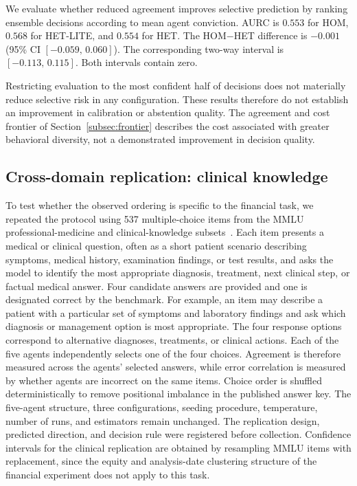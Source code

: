 \documentclass{ieeeaccess}
\begin{document}
We evaluate whether reduced agreement improves selective prediction by ranking
ensemble decisions according to mean agent conviction. AURC is $0.553$ for HOM,
$0.568$ for HET-LITE, and $0.554$ for HET. The HOM$-$HET difference is $-0.001$
(95\% CI $[-0.059,\,0.060]$). The corresponding two-way interval is
$[-0.113,\,0.115]$. Both intervals contain zero.

Restricting evaluation to the most confident half of decisions does not
materially reduce selective risk in any configuration. These results therefore do
not establish an improvement in calibration or abstention quality. The agreement
and cost frontier of Section~\ref{subsec:frontier} describes the cost associated
with greater behavioral diversity, not a demonstrated improvement in decision
quality.

\subsection{Cross-domain replication: clinical knowledge}
\label{subsec:crossdomain}
To test whether the observed ordering is specific to the financial task, we
repeated the protocol using 537 multiple-choice items from the MMLU
professional-medicine and clinical-knowledge subsets~\cite{hendrycks2021mmlu}.
Each item presents a medical or clinical question, often as a short patient
scenario describing symptoms, medical history, examination findings, or test
results, and asks the model to identify the most appropriate diagnosis,
treatment, next clinical step, or factual medical answer. Four candidate answers
are provided and one is designated correct by the benchmark. For example, an item
may describe a patient with a particular set of symptoms and laboratory findings
and ask which diagnosis or management option is most appropriate. The four
response options correspond to alternative diagnoses, treatments, or clinical
actions. Each of the five agents independently selects one of the four choices.
Agreement is therefore measured across the agents' selected answers, while error
correlation is measured by whether agents are incorrect on the same items.
Choice order is shuffled deterministically to
remove positional imbalance in the published answer key. The five-agent
structure, three configurations, seeding procedure, temperature, number of runs,
and estimators remain unchanged. The replication design, predicted direction, and
decision rule were registered before collection. Confidence intervals for the
clinical replication are obtained by resampling MMLU items with replacement,
since the equity and analysis-date clustering structure of the financial
experiment does not apply to this task.
\end{document}
